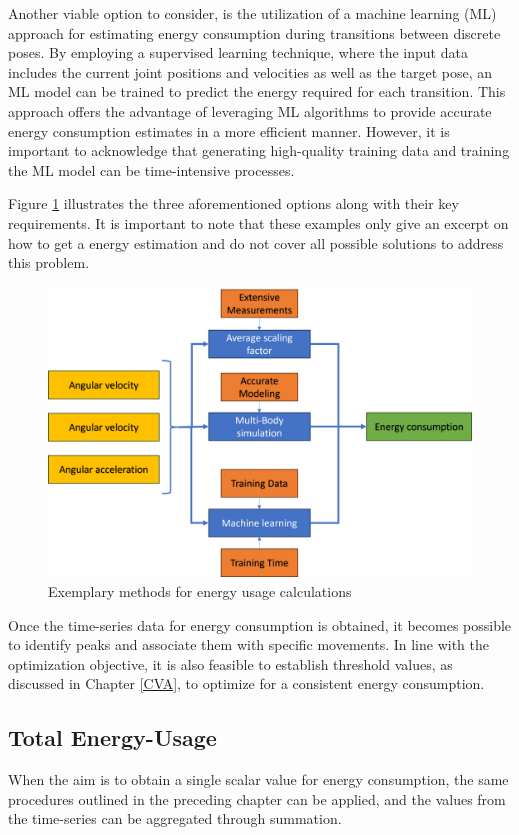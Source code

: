 Another viable option to consider, is the utilization of a machine learning (ML) approach for estimating energy consumption during transitions between discrete poses. By employing a supervised learning technique, where the input data includes the current joint positions and velocities as well as the target pose, an ML model can be trained to predict the energy required for each transition. This approach offers the advantage of leveraging ML algorithms to provide accurate energy consumption estimates in a more efficient manner. However, it is important to acknowledge that generating high-quality training data and training the ML model can be time-intensive processes.

Figure \ref{ENERGYOPTIONS} illustrates the three aforementioned options along with their key requirements. It is important to note that these examples only give an excerpt on how to get a energy estimation and do not cover all possible solutions to address this problem. 

\begin{figure}[H]
	\centerline{\includegraphics[width=.9\textwidth]{figures/ENERGYOPTIONS.png}}
	\caption{Exemplary methods for energy usage calculations}
	\label{ENERGYOPTIONS}
\end{figure}

Once the time-series data for energy consumption is obtained, it becomes possible to identify peaks and associate them with specific movements. In line with the optimization objective, it is also feasible to establish threshold values, as discussed in Chapter \ref{CVA}, to optimize for a consistent energy consumption.


\subsection{Total Energy-Usage}
When the aim is to obtain a single scalar value for energy consumption, the same procedures outlined in the preceding chapter can be applied, and the values from the time-series can be aggregated through summation.

